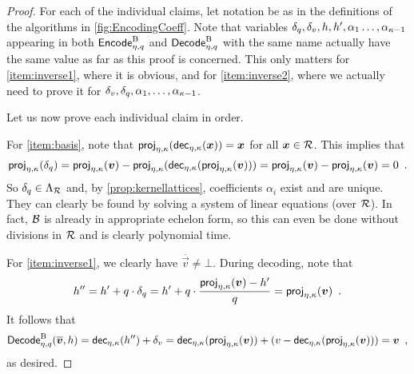 \begin{proof}
For each of the individual claims, let notation be as in the definitions of the algorithms in \autoref{fig:EncodingCoeff}.
Note that variables $\delta_q,\delta_v, h, h', \alpha_1\ldots,\alpha_{\kappa-1}$ appearing in both $\mathsf{Encode}^{\textup{B}}_{\eta,q}$ and $\mathsf{Decode}^{\textup{B}}_{\eta,q}$ with the same name actually have the same value as far as this proof is concerned.
This only matters for \autoref{item:inverse1}, where it is obvious, and for \autoref{item:inverse2}, where we actually need to prove it for $\delta_v, \delta_q,\alpha_1,\ldots,\alpha_{\kappa-1}$.

\medskip\noindent
Let us now prove each individual claim in order.

\bigskip\noindent
For \autoref{item:basis}, note that $\mathsf{proj}_{\eta,\kappa}(\mathsf{dec}_{\eta,\kappa}(\boldsymbol{x})) = \boldsymbol{x}$ for all $\boldsymbol{x}\in\mathcal{R}$. This implies that
\[
 \mathsf{proj}_{\eta,\kappa}(\delta_q) = \mathsf{proj}_{\eta,\kappa}(\boldsymbol{v}) - \mathsf{proj}_{\eta,\kappa}(\mathsf{dec}_{\eta,\kappa}(\mathsf{proj}_{\eta,\kappa}(\boldsymbol{v}))) = \mathsf{proj}_{\eta,\kappa}(\boldsymbol{v}) - \mathsf{proj}_{\eta,\kappa}(\boldsymbol{v}) = 0\enspace.
\]
So $\delta_q\in\Lambda_{\mathcal{R}}$ and, by \autoref{prop:kernellattices}, coefficients $\alpha_i$ exist and are unique.
They can clearly be found by solving a system of linear equations (over $\mathcal{R}$).
In fact, $\mathcal{B}$ is already in appropriate echelon form, so this can even be done without divisions in $\mathcal{R}$ and is clearly polynomial time.

\bigskip\noindent
For \autoref{item:inverse1}, we clearly have $\overline{\vec{v}} \neq \bot$.
During decoding, note that
\[
 h'' = h' + q\cdot\delta_q = h'+q\cdot\frac{\mathsf{proj}_{\eta,\kappa}(\boldsymbol{v})-h'}{q} = \mathsf{proj}_{\eta,\kappa}(\boldsymbol{v})\enspace.
\]
It follows that
\[
 \mathsf{Decode}^{\textup{B}}_{\eta,q}(\overline{\boldsymbol{v}}, h) = \mathsf{dec}_{\eta,\kappa}(h'') + \delta_v = \mathsf{dec}_{\eta,\kappa}(\mathsf{proj}_{\eta,\kappa}(\boldsymbol{v})) + (v - \mathsf{dec}_{\eta,\kappa}(\mathsf{proj}_{\eta,\kappa}(\boldsymbol{v}))) = \boldsymbol{v}\enspace,
\]
as desired.



\end{proof}
